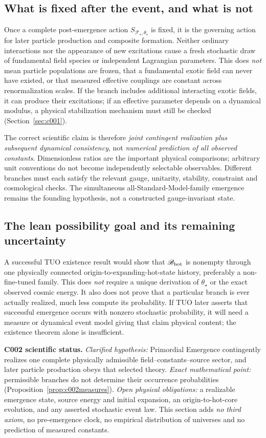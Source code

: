 \documentclass[11pt,a4paper]{article}
\theoremstyle{tmon}
\theoremstyle{definition}
\begin{document}
\subsection{What is fixed after the event, and what is not}
Once a complete post-emergence action $S_{\mathscr F_\star,\theta_\star}$ is fixed, it is the governing action for later particle production and composite formation. Neither ordinary interactions nor the appearance of new excitations cause a fresh stochastic draw of fundamental field species or independent Lagrangian parameters. This does \emph{not} mean particle populations are frozen, that a fundamental exotic field can never have existed, or that measured effective couplings are constant across renormalization scales. If the branch includes additional interacting exotic fields, it can produce their excitations; if an effective parameter depends on a dynamical modulus, a physical stabilization mechanism must still be checked (Section~\ref{sec:c001}).

The correct scientific claim is therefore \emph{joint contingent realization plus subsequent dynamical consistency}, not \emph{numerical prediction of all observed constants}. Dimensionless ratios are the important physical comparisons; arbitrary unit conventions do not become independently selectable observables. Different branches must each satisfy the relevant gauge, unitarity, stability, constraint and cosmological checks. The simultaneous all-Standard-Model-family emergence remains the founding hypothesis, not a constructed gauge-invariant state.

\subsection{The lean possibility goal and its remaining uncertainty}
A successful TUO existence result would show that $\mathscr B_{\rm hot}$ is nonempty through one physically connected origin-to-expanding-hot-state history, preferably a non-fine-tuned family. This does \emph{not} require a unique derivation of $\theta_\star$ or the exact observed cosmic energy. It also does not prove that a particular branch is ever actually realized, much less compute its probability. If TUO later asserts that successful emergence occurs with nonzero stochastic probability, it will need a measure or dynamical event model giving that claim physical content; the existence theorem alone is insufficient.

\begin{warningbox}
\textbf{C002 scientific status.} \emph{Clarified hypothesis:} Primordial Emergence contingently realizes one complete physically admissible field--constants--source sector, and later particle production obeys that selected theory. \emph{Exact mathematical point:} permissible branches do not determine their occurrence probabilities (Proposition~\ref{prop:c002measures}). \emph{Open physical obligations:} a realizable emergence state, source energy and initial expansion, an origin-to-hot-core evolution, and any asserted stochastic event law. This section adds \emph{no third axiom}, no pre-emergence clock, no empirical distribution of universes and no prediction of measured constants.
\end{warningbox}
\end{document}
